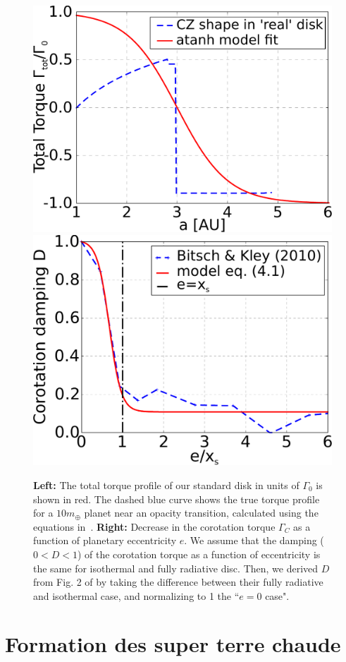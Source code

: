 \begin{figure}[htb]
\centering
\includegraphics[width=0.49\linewidth]{figure/shifted/torque_zoom_CZ1.pdf}\hfill
\includegraphics[width=0.49\linewidth]{figure/shifted/corotation_damping_profile.pdf}
\caption{{\bf Left:} The total torque profile of our standard disk in units of $\Gamma_0$ is shown in red. The dashed blue curve shows the true torque profile for a $10m_\oplus$ planet near an opacity transition, calculated using the equations in~\cite{paardekooper2011torque}. {\bf Right:} Decrease in the corotation torque $\Gamma_C$ as a function of planetary eccentricity $e$. We assume that the damping ($0<D<1$) of the corotation torque as a function of eccentricity is the same for isothermal and fully radiative disc. Then, we derived $D$ from Fig. 2 of \cite{bitsch2010orbital} by taking the difference between their fully radiative and isothermal case, and normalizing to 1 the ``$e=0$ case".}

\label{fig:eccentricity-influence}
\end{figure}

\section{Formation des super terre chaude}
%
%



